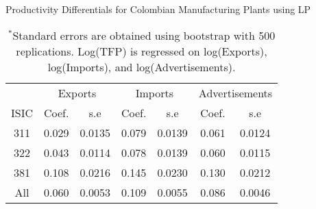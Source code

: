 \documentclass[12pt]{article}
\begin{document}
\begin{appendices}
\begin{table}[H]
\centering
\caption{Productivity Differentials for Colombian Manufacturing Plants using LP}
\small
\begin{tabular}{ccccccc}
  \hline\hline & \multicolumn{2}{c}{Exports}  & \multicolumn{2}{c}{Imports} & \multicolumn{2}{c}{Advertisements} \\ \cmidrule(lr){2-3} \cmidrule(lr){4-5} \cmidrule(lr){6-7}ISIC & Coef. & s.e & Coef. & s.e & Coef. & s.e \\ 
  \hline
311 & 0.029 & 0.0135 & 0.079 & 0.0139 & 0.061 & 0.0124 \\ 
  322 & 0.043 & 0.0114 & 0.078 & 0.0139 & 0.060 & 0.0115 \\ 
  381 & 0.108 & 0.0216 & 0.145 & 0.0230 & 0.130 & 0.0212 \\ 
  All & 0.060 & 0.0053 & 0.109 & 0.0055 & 0.086 & 0.0046 \\ 
   \hline
\end{tabular}
\caption*{\footnotesize $^{*}$Standard errors are obtained using bootstrap with 500 replications. Log(TFP) is regressed on log(Exports), log(Imports), and log(Advertisements).}
\label{LPCOLTFPP}
\end{table}


















\end{appendices}
\end{document}
